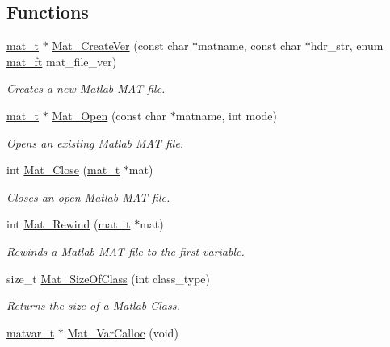 \subsection*{Functions}
\begin{DoxyCompactItemize}
\item 
\hyperlink{group__MAT_gab0fc888f5a5d79943b16284b1f91c2e8}{mat\-\_\-t} $\ast$ \hyperlink{group__MAT_ga22d404f203af7869c841400e7ad247cf}{Mat\-\_\-\-Create\-Ver} (const char $\ast$matname, const char $\ast$hdr\-\_\-str, enum \hyperlink{group__MAT_gad03442b8378999189d510e3745c702b7}{mat\-\_\-ft} mat\-\_\-file\-\_\-ver)
\begin{DoxyCompactList}\small\item\em Creates a new Matlab M\-A\-T file. \end{DoxyCompactList}\item 
\hyperlink{group__MAT_gab0fc888f5a5d79943b16284b1f91c2e8}{mat\-\_\-t} $\ast$ \hyperlink{group__MAT_gafbfedb5636a99f0ef867520c47f77d18}{Mat\-\_\-\-Open} (const char $\ast$matname, int mode)
\begin{DoxyCompactList}\small\item\em Opens an existing Matlab M\-A\-T file. \end{DoxyCompactList}\item 
int \hyperlink{group__MAT_ga101c92ff7bde4a2d4615661beba09262}{Mat\-\_\-\-Close} (\hyperlink{group__MAT_gab0fc888f5a5d79943b16284b1f91c2e8}{mat\-\_\-t} $\ast$mat)
\begin{DoxyCompactList}\small\item\em Closes an open Matlab M\-A\-T file. \end{DoxyCompactList}\item 
int \hyperlink{group__MAT_ga4d6e3892d2e216c507a744ba0e070d0b}{Mat\-\_\-\-Rewind} (\hyperlink{group__MAT_gab0fc888f5a5d79943b16284b1f91c2e8}{mat\-\_\-t} $\ast$mat)
\begin{DoxyCompactList}\small\item\em Rewinds a Matlab M\-A\-T file to the first variable. \end{DoxyCompactList}\item 
size\-\_\-t \hyperlink{group__MAT_ga2bf682f015b22fa796a8885e997661e7}{Mat\-\_\-\-Size\-Of\-Class} (int class\-\_\-type)
\begin{DoxyCompactList}\small\item\em Returns the size of a Matlab Class. \end{DoxyCompactList}\item 
\hyperlink{structmatvar__t}{matvar\-\_\-t} $\ast$ \hyperlink{group__MAT_gae7c9c3699f6e9c31a9c490300013098c}{Mat\-\_\-\-Var\-Calloc} (void)

\end{DoxyCompactItemize}
